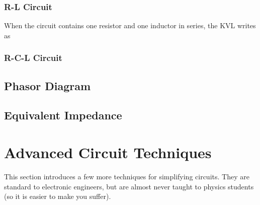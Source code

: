 \documentclass[class=article, crop=false, 12pt]{standalone}
\begin{document}
\subsubsection{R-L Circuit}

When the circuit contains one resistor and one inductor in series, 
the KVL writes as 



\subsubsection{R-C-L Circuit}


\subsection{Phasor Diagram}


\subsection{Equivalent Impedance}

\linesep
\section{Advanced Circuit Techniques}

This section introduces a few more techniques for simplifying circuits.
They are standard to electronic engineers,
but are almost never taught to physics students (so it is easier to make you suffer).
\end{document}
